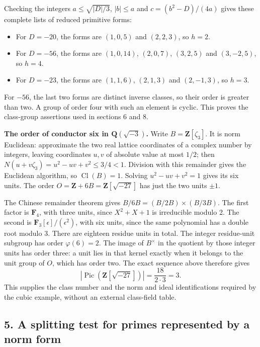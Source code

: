 \documentclass[11pt,a4paper]{article}
\newcommand{\tightlist}{\setlength{\itemsep}{0pt}\setlength{\parskip}{0pt}}
\begin{document}
Checking the integers \(a\leq\sqrt{|D|/3}\), \(|b|\leq a\) and
\(c=(b^2-D)/(4a)\) gives these complete lists of reduced primitive
forms:

\begin{itemize}
\tightlist
\item
  For \(D=-20\), the forms are \((1,0,5)\) and \((2,2,3)\), so \(h=2\).
\item
  For \(D=-56\), the forms are \((1,0,14)\), \((2,0,7)\), \((3,2,5)\)
  and \((3,-2,5)\), so \(h=4\).
\item
  For \(D=-23\), the forms are \((1,1,6)\), \((2,1,3)\) and
  \((2,-1,3)\), so \(h=3\).
\end{itemize}

For \(-56\), the last two forms are distinct inverse classes, so their
order is greater than two. A group of order four with such an element is
cyclic. This proves the class-group assertions used in sections 6 and 8.

\textbf{The order of conductor six in \(\mathbf Q(\sqrt{-3})\).} Write
\(B=\mathbf Z[\zeta_3]\). It is norm Euclidean: approximate the two real
lattice coordinates of a complex number by integers, leaving coordinates
\(u,v\) of absolute value at most \(1/2\); then
\(N(u+v\zeta_3)=u^2-uv+v^2\leq3/4<1\). Division with this remainder
gives the Euclidean algorithm, so \(\operatorname{Cl}(B)=1\). Solving
\(u^2-uv+v^2=1\) gives its six units. The order
\(O=\mathbf Z+6B=\mathbf Z[\sqrt{-27}]\) has just the two units
\(\pm1\).

The Chinese remainder theorem gives \(B/6B=(B/2B)\times(B/3B)\). The
first factor is \(\mathbf F_4\), with three units, since \(X^2+X+1\) is
irreducible modulo 2. The second is
\(\mathbf F_3[\epsilon]/(\epsilon^2)\), with six units, since the same
polynomial has a double root modulo 3. There are eighteen residue units
in total. The integer residue-unit subgroup has order \(\varphi(6)=2\).
The image of \(B^\times\) in the quotient by those integer units has
order three: a unit lies in that kernel exactly when it belongs to the
unit group of \(O\), which has order two. The exact sequence above
therefore gives \[
|\operatorname{Pic}(\mathbf Z[\sqrt{-27}])|=\frac{18}{2\cdot3}=3.
\] This supplies the class number and the norm and ideal identifications
required by the cubic example, without an external class-field table.

\subsection{5. A splitting test for primes represented by a norm
form}\label{a-splitting-test-for-primes-represented-by-a-norm-form}
\end{document}
